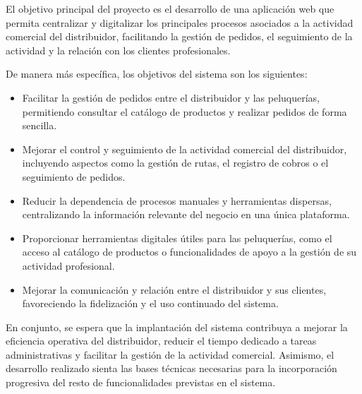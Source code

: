El objetivo principal del proyecto es el desarrollo de una aplicación web que permita centralizar y digitalizar los principales procesos asociados a la actividad comercial del distribuidor, facilitando la gestión de pedidos, el seguimiento de la actividad y la relación con los clientes profesionales.

De manera más específica, los objetivos del sistema son los siguientes:

\begin{itemize}
    \item Facilitar la gestión de pedidos entre el distribuidor y las peluquerías, permitiendo consultar el catálogo de productos y realizar pedidos de forma sencilla.
    \item Mejorar el control y seguimiento de la actividad comercial del distribuidor, incluyendo aspectos como la gestión de rutas, el registro de cobros o el seguimiento de pedidos.
    \item Reducir la dependencia de procesos manuales y herramientas dispersas, centralizando la información relevante del negocio en una única plataforma.
    \item Proporcionar herramientas digitales útiles para las peluquerías, como el acceso al catálogo de productos o funcionalidades de apoyo a la gestión de su actividad profesional.
    \item Mejorar la comunicación y relación entre el distribuidor y sus clientes, favoreciendo la fidelización y el uso continuado del sistema.
\end{itemize}

En conjunto, se espera que la implantación del sistema contribuya a mejorar la eficiencia operativa del distribuidor, reducir el tiempo dedicado a tareas administrativas y facilitar la gestión de la actividad comercial. Asimismo, el desarrollo realizado sienta las bases técnicas necesarias para la incorporación progresiva del resto de funcionalidades previstas en el sistema.